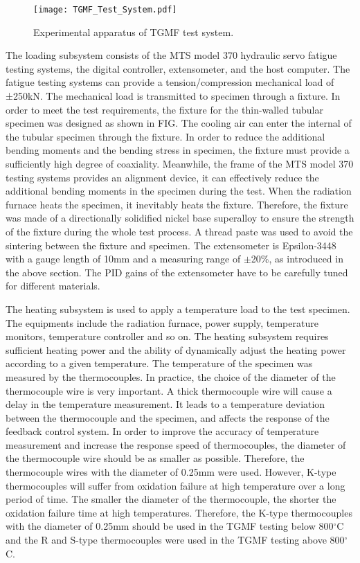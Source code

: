 \begin{figure}[!htp]
	\centering
	\texttt{[image: TGMF\_Test\_System.pdf]}
	\caption{Experimental apparatus of TGMF test system.}
	\label{Fig:TGMF_Test_System}
\end{figure}

The loading subsystem consists of the MTS model 370 hydraulic servo fatigue testing systems, the digital controller, extensometer, and the host computer. The fatigue testing systems can provide a tension/compression mechanical load of ±250kN. The mechanical load is transmitted to specimen through a fixture. 
In order to meet the test requirements, the fixture for the thin-walled tubular specimen was designed as shown in FIG.
The cooling air can enter the internal of the tubular specimen through the fixture.
In order to reduce the additional bending moments and the bending stress in specimen, the fixture must provide a sufficiently high degree of coaxiality. Meanwhile, the frame of the MTS model 370 testing systems provides an alignment device, it can effectively reduce the additional bending moments in the specimen during the test.
When the radiation furnace heats the specimen, it inevitably heats the fixture. Therefore, the fixture was made of a directionally solidified nickel base superalloy to ensure the strength of the fixture during the whole test process. A thread paste was used to avoid the sintering between the fixture and specimen.
The extensometer is Epsilon-3448 with a gauge length of 10mm and a measuring range of $\pm$20\%, as introduced in the above section. The PID gains of the extensometer have to be carefully tuned for different materials.

The heating subsystem is used to apply a temperature load to the test specimen. The equipments include the radiation furnace, power supply, temperature monitors, temperature controller and so on. The heating subsystem requires sufficient heating power and the ability of dynamically adjust the heating power according to a given temperature.
The temperature of the specimen was measured by the thermocouples. In practice, the choice of the diameter of the thermocouple wire is very important. A thick thermocouple wire will cause a delay in the temperature measurement. It leads to a temperature deviation between the thermocouple and the specimen, and affects the response of the feedback control system. In order to improve the accuracy of temperature measurement and increase the response speed of thermocouples, the diameter of the thermocouple wire should be as smaller as possible. Therefore, the thermocouple wires with the diameter of 0.25mm were used.
However, K-type thermocouples will suffer from oxidation failure at high temperature over a long period of time. The smaller the diameter of the thermocouple, the shorter the oxidation failure time at high temperatures. Therefore, the K-type thermocouples with the diameter of 0.25mm should be used in the TGMF testing below 800$^\circ$C and the R and S-type thermocouples were used in the TGMF testing above 800$^\circ$C.

